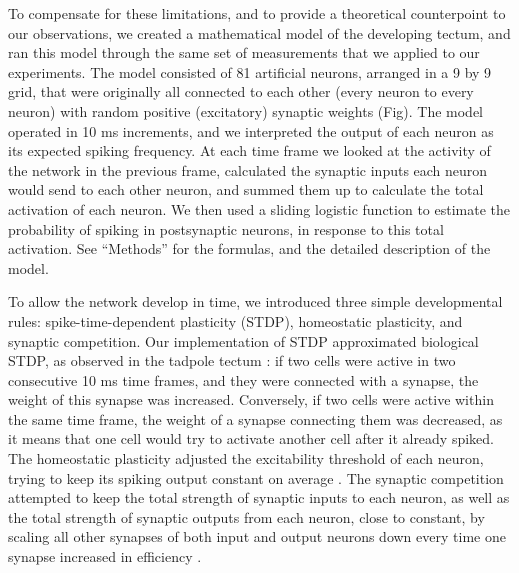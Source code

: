 \documentclass{article}
\begin{document}
To compensate for these limitations, and to provide a theoretical counterpoint to our observations, we created a mathematical model of the developing tectum, and ran this model through the same set of measurements that we applied to our experiments. The model consisted of 81 artificial neurons, arranged in a 9 by 9 grid, that were originally all connected to each other (every neuron to every neuron) with random positive (excitatory) synaptic weights (Fig). The model operated in 10 ms increments, and we interpreted the output of each neuron as its expected spiking frequency. At each time frame we looked at the activity of the network in the previous frame, calculated the synaptic inputs each neuron would send to each other neuron, and summed them up to calculate the total activation of each neuron. We then used a sliding logistic function to estimate the probability of spiking in postsynaptic neurons, in response to this total activation. See “Methods” for the formulas, and the detailed description of the model.

To allow the network develop in time, we introduced three simple developmental rules: spike-time-dependent plasticity (STDP), homeostatic plasticity, and synaptic competition. Our implementation of STDP approximated biological STDP, as observed in the tadpole tectum \citep{zhang1998stdp,mu2006stdp}: if two cells were active in two consecutive 10 ms time frames, and they were connected with a synapse, the weight of this synapse was increased. Conversely, if two cells were active within the same time frame, the weight of a synapse connecting them was decreased, as it means that one cell would try to activate another cell after it already spiked. The homeostatic plasticity adjusted the excitability threshold of each neuron, trying to keep its spiking output constant on average \citep{pratt2007intrinsic,turrigiano2011}. The synaptic competition attempted to keep the total strength of synaptic inputs to each neuron, as well as the total strength of synaptic outputs from each neuron, close to constant, by scaling all other synapses of both input and output neurons down every time one synapse increased in efficiency \citep{hamodi2016nmda,cohen2002synreview,munz2014hebbian}.
\end{document}
